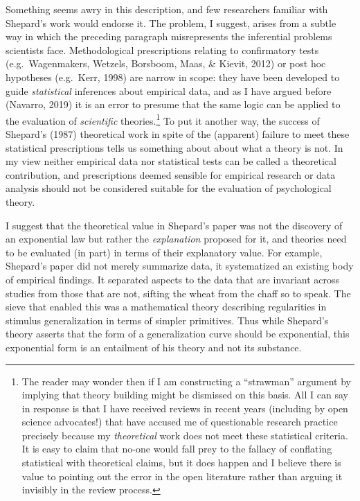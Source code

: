 \documentclass[
  english,
  doc]{apa6}
\begin{document}
Something seems awry in this description, and few researchers familiar with Shepard's work would endorse it. The problem, I suggest, arises from a subtle way in which the preceding paragraph misrepresents the inferential problems scientists face. Methodological prescriptions relating to confirmatory tests (e.g.~Wagenmakers, Wetzels, Borsboom, Maas, \& Kievit, 2012) or post hoc hypotheses (e.g.~Kerr, 1998) are narrow in scope: they have been developed to guide \emph{statistical} inferences about empirical data, and as I have argued before (Navarro, 2019) it is an error to presume that the same logic can be applied to the evaluation of \emph{scientific} theories.\footnote{The reader may wonder then if I am constructing a \enquote{strawman} argument by implying that theory building might be dismissed on this basis. All I can say in response is that I have received reviews in recent years (including by open science advocates!) that have accused me of questionable research practice precisely because my \emph{theoretical} work does not meet these statistical criteria. It is easy to claim that no-one would fall prey to the fallacy of conflating statistical with theoretical claims, but it does happen and I believe there is value to pointing out the error in the open literature rather than arguing it invisibly in the review process.} To put it another way, the success of Shepard's (1987) theoretical work in spite of the (apparent) failure to meet these statistical prescriptions tells us something about about what a theory is not. In my view neither empirical data nor statistical tests can be called a theoretical contribution, and prescriptions deemed sensible for empirical research or data analysis should not be considered suitable for the evaluation of psychological theory.

I suggest that the theoretical value in Shepard's paper was not the discovery of an exponential law but rather the \emph{explanation} proposed for it, and theories need to be evaluated (in part) in terms of their explanatory value. For example, Shepard's paper did not merely summarize data, it systematized an existing body of empirical findings. It separated aspects to the data that are invariant across studies from those that are not, sifting the wheat from the chaff so to speak. The sieve that enabled this was a mathematical theory describing regularities in stimulus generalization in terms of simpler primitives. Thus while Shepard's theory asserts that the form of a generalization curve should be exponential, this exponential form is an entailment of his theory and not its substance.
\end{document}
